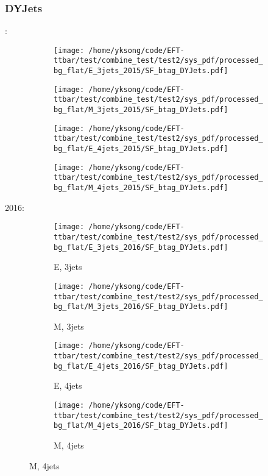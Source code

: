 \documentclass{beamer}
\begin{document}
\begin{frame}
\frametitle{DYJets}
\fontsize{5}{1}:
\begin{figure}
\centering
\begin{subfigure}[b]{0.24\textwidth}
\texttt{[image: /home/yksong/code/EFT-ttbar/test/combine\_test/test2/sys\_pdf/processed\_bg\_flat/E\_3jets\_2015/SF\_btag\_DYJets.pdf]}
\end{subfigure}
\begin{subfigure}[b]{0.24\textwidth}
\texttt{[image: /home/yksong/code/EFT-ttbar/test/combine\_test/test2/sys\_pdf/processed\_bg\_flat/M\_3jets\_2015/SF\_btag\_DYJets.pdf]}
\end{subfigure}
\begin{subfigure}[b]{0.24\textwidth}
\texttt{[image: /home/yksong/code/EFT-ttbar/test/combine\_test/test2/sys\_pdf/processed\_bg\_flat/E\_4jets\_2015/SF\_btag\_DYJets.pdf]}
\end{subfigure}
\begin{subfigure}[b]{0.24\textwidth}
\texttt{[image: /home/yksong/code/EFT-ttbar/test/combine\_test/test2/sys\_pdf/processed\_bg\_flat/M\_4jets\_2015/SF\_btag\_DYJets.pdf]}
\end{subfigure}
\end{figure}
2016:
\begin{figure}
\centering
\begin{subfigure}[b]{0.24\textwidth}
\texttt{[image: /home/yksong/code/EFT-ttbar/test/combine\_test/test2/sys\_pdf/processed\_bg\_flat/E\_3jets\_2016/SF\_btag\_DYJets.pdf]}
\captionsetup{font=tiny}
\caption{E, 3jets}
\end{subfigure}
\begin{subfigure}[b]{0.24\textwidth}
\texttt{[image: /home/yksong/code/EFT-ttbar/test/combine\_test/test2/sys\_pdf/processed\_bg\_flat/M\_3jets\_2016/SF\_btag\_DYJets.pdf]}
\captionsetup{font=tiny}
\caption{M, 3jets}
\end{subfigure}
\begin{subfigure}[b]{0.24\textwidth}
\texttt{[image: /home/yksong/code/EFT-ttbar/test/combine\_test/test2/sys\_pdf/processed\_bg\_flat/E\_4jets\_2016/SF\_btag\_DYJets.pdf]}
\captionsetup{font=tiny}
\caption{E, 4jets}
\end{subfigure}
\begin{subfigure}[b]{0.24\textwidth}
\texttt{[image: /home/yksong/code/EFT-ttbar/test/combine\_test/test2/sys\_pdf/processed\_bg\_flat/M\_4jets\_2016/SF\_btag\_DYJets.pdf]}
\captionsetup{font=tiny}
\caption{M, 4jets}
\end{subfigure}
\end{figure}
\end{frame}
\end{document}
